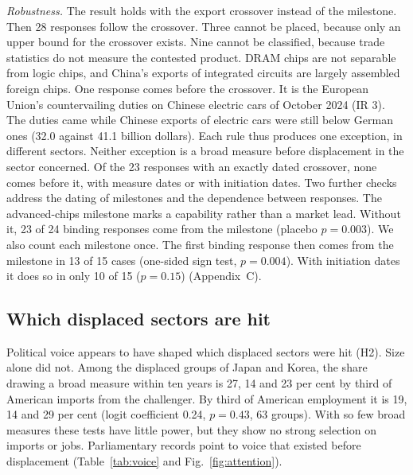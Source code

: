 \documentclass[review,authoryear,12pt]{elsarticle}
\begin{document}
\emph{Robustness.} The result holds with the export crossover instead of the milestone. Then 28 responses follow the crossover. Three cannot be placed, because only an upper bound for the crossover exists. Nine cannot be classified, because trade statistics do not measure the contested product. DRAM chips are not separable from logic chips, and China's exports of integrated circuits are largely assembled foreign chips. One response comes before the crossover. It is the European Union's countervailing duties on Chinese electric cars of October 2024 (IR 3). The duties came while Chinese exports of electric cars were still below German ones (32.0 against 41.1 billion dollars). Each rule thus produces one exception, in different sectors. Neither exception is a broad measure before displacement in the sector concerned. Of the 23 responses with an exactly dated crossover, none comes before it, with measure dates or with initiation dates. Two further checks address the dating of milestones and the dependence between responses. The advanced-chips milestone marks a capability rather than a market lead. Without it, 23 of 24 binding responses come from the milestone (placebo $p=0.003$). We also count each milestone once. The first binding response then comes from the milestone in 13 of 15 cases (one-sided sign test, $p=0.004$). With initiation dates it does so in only 10 of 15 ($p=0.15$) (Appendix~C).

\subsection{Which displaced sectors are hit}\label{sec:selection}

Political voice appears to have shaped which displaced sectors were hit (H2). Size alone did not. Among the displaced groups of Japan and Korea, the share drawing a broad measure within ten years is 27, 14 and 23 per cent by third of American imports from the challenger. By third of American employment it is 19, 14 and 29 per cent (logit coefficient 0.24, $p=0.43$, 63 groups). With so few broad measures these tests have little power, but they show no strong selection on imports or jobs. Parliamentary records point to voice that existed before displacement (Table~\ref{tab:voice} and Fig.~\ref{fig:attention}).
\end{document}
